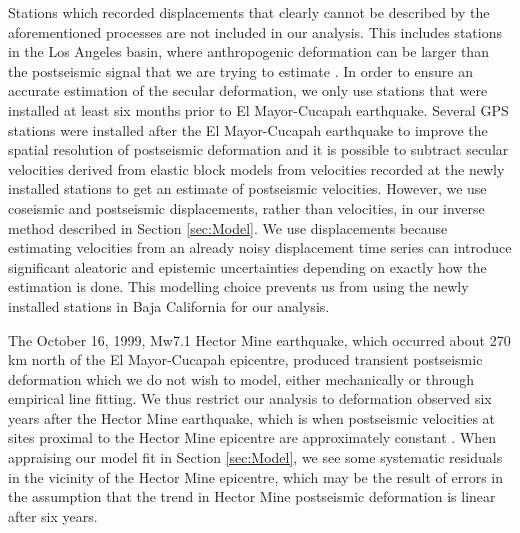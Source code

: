 \documentclass[1p]{elsarticle}
\begin{document}
Stations which recorded displacements that clearly cannot be described by the aforementioned processes are not included in our analysis. This includes stations in the Los Angeles basin, where anthropogenic deformation can be larger than the postseismic signal that we are trying to estimate \citep{Bawden2001,Argus2005} . In order to ensure an accurate estimation of the secular deformation, we only use stations that were installed at least six months prior to El Mayor-Cucapah earthquake. Several GPS stations were installed after the El Mayor-Cucapah earthquake to improve the spatial resolution of postseismic deformation \citep{Spinler2015} and it is possible to subtract secular velocities derived from elastic block models \citep[e.g.][]{Meade2005} from velocities recorded at the newly installed stations to get an estimate of postseismic velocities. However, we use coseismic and postseismic displacements, rather than velocities, in our inverse method described in Section \ref{sec:Model}. We use displacements because estimating velocities from an already noisy displacement time series can introduce significant aleatoric and epistemic uncertainties depending on exactly how the estimation is done. This modelling choice prevents us from using the newly installed stations in Baja California for our analysis.   

The October 16, 1999, Mw7.1 Hector Mine earthquake, which occurred about 270 km north of the El Mayor-Cucapah epicentre, produced transient postseismic deformation which we do not wish to model, either mechanically or through empirical line fitting.  We thus restrict our analysis to deformation observed six years after the Hector Mine earthquake, which is when postseismic velocities at sites proximal to the Hector Mine epicentre are approximately constant \citep{Savage2009}. When appraising our model fit in Section \ref{sec:Model}, we see some systematic residuals in the vicinity of the Hector Mine epicentre, which may be the result of errors in the assumption that the trend in Hector Mine postseismic deformation is linear after six years.   
\end{document}
